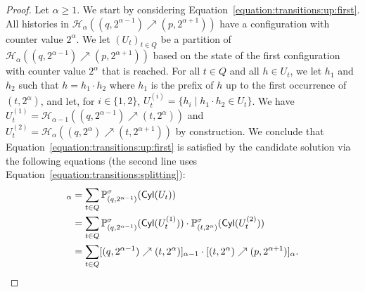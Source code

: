 \documentclass[a4paper,UKenglish,cleveref,autoref,thm-restate,colorlinks]{lipics-v2021}
\newcommand{\cyl}[1]{\mathsf{Cyl}(#1)}
\newcommand{\histPart}{\mathcal{H}}
\newcommand{\hist}{h}
\newcommand{\histConcat}[2]{#1\cdot{}#2}
\newcommand{\ocStateSpace}{Q}
\newcommand{\ocState}{q}
\newcommand{\ocStateB}{p}
\newcommand{\ocStateC}{t}
\newcommand{\powerIndex}{\alpha}
\newcommand{\upProba}[5]{[(#1,#2)\nearrow{}(#3,#4)]_{#5}}
\newcommand{\upHistSet}[5]{\histPart_{#5}((#1,#2)\nearrow{}(#3,#4))}
\newcommand{\upPart}[1]{U_{#1}}
\newcommand{\stratGeneric}[1]{{\sigma_{#1}}}
\newcommand{\strat}{\stratGeneric{}}
\begin{document}
\begin{proof}
  Let $\powerIndex\geq 1$.
  We start by considering Equation~\eqref{equation:transitions:up:first}.
  All histories in $\upHistSet{\ocState}{2^{\powerIndex-1}}{\ocStateB}{2^{\powerIndex+1}}{\powerIndex}$ have a configuration with counter value $2^\powerIndex$.
  We let $(\upPart{\ocStateC})_{\ocStateC\in\ocStateSpace}$ be a partition of $\upHistSet{\ocState}{2^{\powerIndex-1}}{\ocStateB}{2^{\powerIndex+1}}{\powerIndex}$ based on the state of the first configuration with counter value $2^\powerIndex$ that is reached.
  For all $\ocStateC\in\ocStateSpace$ and all $\hist\in\upPart{\ocStateC}$, we let $\hist_1$ and $\hist_2$ such that $\hist = \histConcat{\hist_1}{\hist_2}$ where $\hist_1$ is the prefix of $\hist$ up to the first occurrence of $(\ocStateC, 2^{\powerIndex})$, and let, for $i\in\{1, 2\}$, $\upPart{\ocStateC}^{(i)} = \{\hist_i\mid \histConcat{\hist_1}{\hist_2}\in\upPart{\ocStateC}\}$.
  We have $\upPart{\ocStateC}^{(1)} = \upHistSet{\ocState}{2^{\powerIndex-1}}{\ocStateC}{2^\powerIndex}{\powerIndex-1}$ and $\upPart{\ocStateC}^{(2)} = \upHistSet{\ocState}{2^{\powerIndex}}{\ocStateC}{2^{\powerIndex+1}}{\powerIndex}$ by construction.
  We conclude that Equation~\eqref{equation:transitions:up:first} is satisfied by the candidate solution via the following equations (the second line uses Equation~\eqref{equation:transitions:splitting}):
  \begin{align*}
    \upProba{\ocState}{2^{\powerIndex-1}}{\ocStateB}{2^{\powerIndex+1}}{\powerIndex}
    & = \sum_{t\in\ocStateSpace}\probaG{(\ocState, 2^{\powerIndex-1})}{\strat}(\cyl{\upPart{\ocStateC}}) \\
& = \sum_{t\in\ocStateSpace}
      \probaG{(\ocState, 2^{\powerIndex-1})}{\strat}(\cyl{\upPart{\ocStateC}^{(1)}})\cdot
      \probaG{(\ocStateC, 2^{\powerIndex})}{\strat}(\cyl{\upPart{\ocStateC}^{(2)}})
    \\
& =
      \sum_{t\in\ocStateSpace}
      \upProba{\ocState}{2^{\powerIndex-1}}{\ocStateC}{2^{\powerIndex}}{\powerIndex-1}
      \cdot
      \upProba{\ocStateC}{2^{\powerIndex}}{\ocStateB}{2^{\powerIndex+1}}{\powerIndex}.
  \end{align*}
  

\end{proof}
\end{document}
